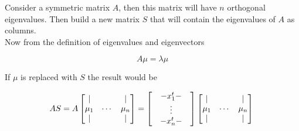 \documentclass{article}
\begin{document}
    Consider a symmetric matrix $A$, then this matrix will have $n$ orthogonal
    eigenvalues. Then build a new matrix $S$ that will contain the eigenvalues of
    $A$ as columns.\\

    Now from the definition of eigenvalues and eigenvectors

    \begin{equation*}
        A \mu = \lambda \mu
    \end{equation*}

    If $\mu$ is replaced with $S$ the result would be

    \[
        A S = A 
        \begin{bmatrix}
              |   &        &   |  \\
            \mu_1 & \cdots & \mu_n\\
              |   &        &   |  \\
        \end{bmatrix}
        =
        \begin{bmatrix}
             & - x_1^t - &\\
             &  \vdots   &\\
             & - x_n^t - &\\
        \end{bmatrix}
        \begin{bmatrix}
              |   &        &   |  \\
            \mu_1 & \cdots & \mu_n\\
              |   &        &   |  \\
        \end{bmatrix}\\
    \]
\end{document}

